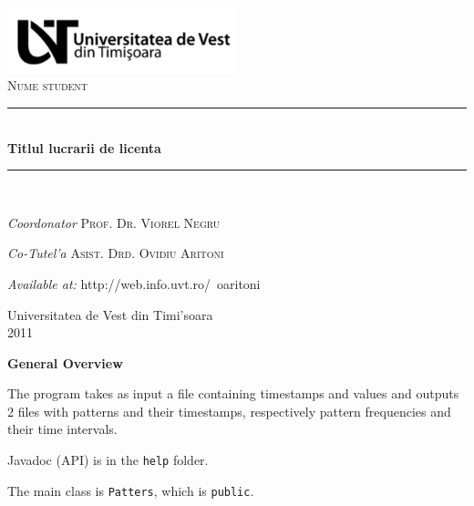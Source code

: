 \documentclass[a4paper,12pt]{article}
\newcommand{\HRule}{\rule{\linewidth}{0.5mm}}
\begin{document}
\begin{titlepage}

\begin{center}


\includegraphics[width=0.5\textwidth]{Screenshot.png}\\[1cm]    

\textsc{\LARGE Nume student}\\[0.5cm]


\vfill 
\HRule \\[0.4cm]
{ \huge \bfseries Titlul lucrarii de licenta}\\[0.4cm]

\HRule \\[1.5cm]


\begin{flushleft} \large
\emph{Coordonator} \textsc{Prof. Dr. Viorel Negru}
\end{flushleft}

\begin{flushleft} \large
\emph{Co-Tutel'a} \textsc{Asist. Drd. Ovidiu Aritoni}
\end{flushleft}

\begin{flushleft} \large
\emph{Available at:}  {http://web.info.uvt.ro/~oaritoni} 
\end{flushleft}
\vfill
{\large Universitatea de Vest din Timi'soara \\ 2011}

\end{center}

\end{titlepage}

\newpage

\textbf{General Overview}

  The program takes as input a file containing timestamps and values
  and outputs 2 files with patterns and their timestamps,
  respectively pattern frequencies and their time intervals.

  Javadoc (API) is in the \verb/help/ folder.

  The main class is \verb/Patters/, which is \verb/public/.
\end{document}

